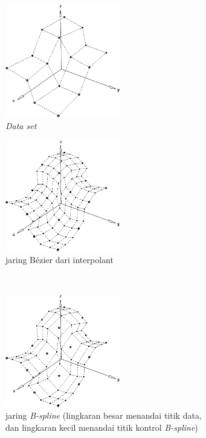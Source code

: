 \begin{figure}[H]
	\centering
	\begin{subfigure}{.5\textwidth}
		\centering
		\includegraphics[keepaspectratio, width=5cm]{gambar/Interpolasi/pic11.png}
		\caption{\textit{Data set}}
		\label{gambar:datasetlocal}
	\end{subfigure}%
	\begin{subfigure}{.5\textwidth}
		\centering
		\includegraphics[keepaspectratio, width=5cm]{gambar/Interpolasi/pic12.png}
		\caption{jaring Bézier dari interpolant}
		\label{gambar:beziernet}
	\end{subfigure} \\
	\begin{subfigure}{.5\textwidth}
		\centering
		\includegraphics[keepaspectratio, width=5cm]{gambar/Interpolasi/pic13.png}
		\caption{jaring \textit{B-spline} (lingkaran besar menandai 
		titik data, dan lingkaran kecil menandai titik 
		kontrol \textit{B-spline})}
		\label{gambar:beziernetdetail}
	\end{subfigure}%
	\begin{subfigure}{.5\textwidth}

\end{subfigure}
\end{figure}
